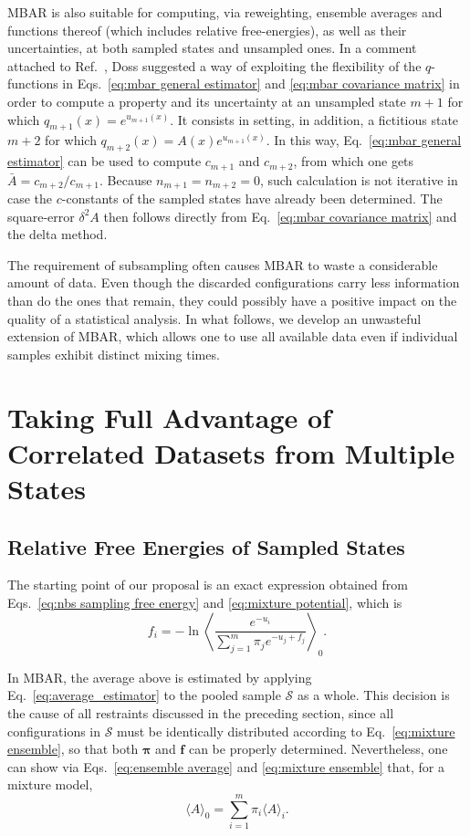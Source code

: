 \documentclass[aip,jcp,reprint,amsmath,amssymb]{revtex4-1}
\newcommand{\vt}[1]{\boldsymbol{\mathbf{#1}}}           %
\begin{document}
MBAR is also suitable for computing, via reweighting, ensemble averages and functions thereof (which includes relative free-energies), as well as their uncertainties, at both sampled states and unsampled ones. In a comment attached to Ref.~, Doss suggested a way of exploiting the flexibility of the $q$-functions in Eqs.~\eqref{eq:mbar general estimator} and \eqref{eq:mbar covariance matrix} in order to compute a property and its uncertainty at an unsampled state $m+1$ for which $q_{m+1}(x) = e^{u_{m+1}(x)}$. It consists in setting, in addition, a fictitious state $m+2$ for which $q_{m+2}(x) = A(x)e^{u_{m+1}(x)}$. In this way, Eq.~\eqref{eq:mbar general estimator} can be used to compute $c_{m+1}$ and $c_{m+2}$, from which one gets $\bar A = {c_{m+2}}/{c_{m+1}}$. Because $n_{m+1} = n_{m+2} = 0$, such calculation is not iterative in case the $c$-constants of the sampled states have already been determined. The square-error $\delta^2 A$ then follows directly from Eq.~\eqref{eq:mbar covariance matrix} and the delta method.

The requirement of subsampling often causes MBAR to waste a considerable amount of data. Even though the discarded configurations carry less information than do the ones that remain, they could possibly have a positive impact on the quality of a statistical analysis. In what follows, we develop an unwasteful extension of MBAR, which allows one to use all available data even if individual samples exhibit distinct mixing times.

\section{Taking Full Advantage of Correlated Datasets from Multiple States}

\subsection{Relative Free Energies of Sampled States}

The starting point of our proposal is an exact expression obtained from Eqs.~\eqref{eq:nbs sampling free energy} and \eqref{eq:mixture potential}, which is
\begin{equation}
\label{eq:free energy exact}
f_i = -\ln \left\langle \frac{e^{-u_i}}{\sum_{j=1}^m \pi_j e^{-u_j + f_j}} \right\rangle_0.
\end{equation}

In MBAR, the average above is estimated by applying Eq.~\eqref{eq:average_estimator} to the pooled sample $\mathcal S$ as a whole. This decision is the cause of all restraints discussed in the preceding section, since all configurations in $\mathcal S$ must be identically distributed according to Eq.~\eqref{eq:mixture ensemble}, so that both $\vt \pi$ and $\vt f$ can be properly determined. Nevertheless, one can show via Eqs.~\eqref{eq:ensemble average} and \eqref{eq:mixture ensemble} that, for a mixture model,
\begin{equation}
\label{eq:mixture average}
\langle A \rangle_0 = \sum_{i=1}^m \pi_i \langle A \rangle_i.
\end{equation}
\end{document}
